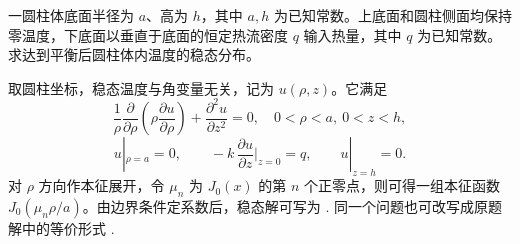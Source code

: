 ﻿

\begin{question}[20分]

一圆柱体底面半径为 $a$、高为 $h$，其中 $a,h$ 为已知常数。上底面和圆柱侧面均保持零温度，下底面以垂直于底面的恒定热流密度 $q$ 输入热量，其中 $q$ 为已知常数。求达到平衡后圆柱体内温度的稳态分布。

\begin{solution}

取圆柱坐标，稳态温度与角变量无关，记为 $u(\rho,z)$。它满足
\[
\frac1\rho\frac{\partial}{\partial\rho}\!\left(\rho\frac{\partial u}{\partial\rho}\right)+\frac{\partial^2u}{\partial z^2}=0,
\quad 0<\rho<a,\ 0<z<h,
\]
\[
u|_{\rho=a}=0,
\qquad -k\,\frac{\partial u}{\partial z}\Big|_{z=0}=q,
\qquad u|_{z=h}=0.
\]
对 $\rho$ 方向作本征展开，令 $\mu_n$ 为 $J_0(x)$ 的第 $n$ 个正零点，则可得一组本征函数 $J_0(\mu_n\rho/a)$。由边界条件定系数后，稳态解可写为
.
同一个问题也可改写成原题解中的等价形式
.

\end{solution}
\end{question}

